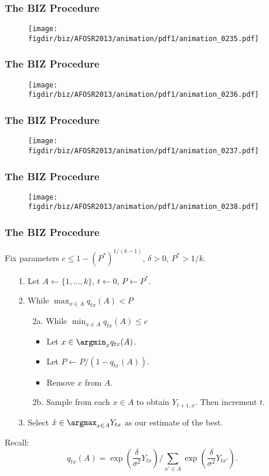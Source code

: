 \documentclass[13pt]{beamer}
\newcommand{\figdir}{../../fig}
\newcommand{\xhat}{\hat{x}}
\newcommand{\upthresh}{P}
\begin{document}
{\begin{frame}\frametitle{The BIZ Procedure}\begin{figure}\texttt{[image: \\figdir/biz/AFOSR2013/animation/pdf1/animation\_0235.pdf]}\end{figure}\end{frame}
\begin{frame}\frametitle{The BIZ Procedure}\begin{figure}\texttt{[image: \\figdir/biz/AFOSR2013/animation/pdf1/animation\_0236.pdf]}\end{figure}\end{frame}
\begin{frame}\frametitle{The BIZ Procedure}\begin{figure}\texttt{[image: \\figdir/biz/AFOSR2013/animation/pdf1/animation\_0237.pdf]}\end{figure}\end{frame}
\begin{frame}\frametitle{The BIZ Procedure}\begin{figure}\texttt{[image: \\figdir/biz/AFOSR2013/animation/pdf1/animation\_0238.pdf]}\end{figure}\end{frame}
}





\begin{frame}
  \frametitle{The BIZ Procedure}
  Fix parameters $c \le 1-(P^*)^{1/(k-1)}$, $\delta>0$, $P^*>1/k$.
  \begin{itemize}
    \item[1.] Let $A \leftarrow \{ 1,\ldots, k\}$, $t\leftarrow 0$, $\upthresh \leftarrow P^*$.
    \item[2.] While $\max_{x\in A} q_{tx}(A) < \upthresh$
    \begin{itemize}
      \item[2a.] While $\min_{x\in A} q_{tx}(A) \le c$
      \begin{itemize}
	\item Let $x \in \argmin_x q_{tx}(A)$.
	\item Let $\upthresh \leftarrow \upthresh/(1-q_{tx}(A))$.
	\item Remove $x$ from $A$.
      \end{itemize}
    \item[2b.] Sample from each $x\in A$ to obtain $Y_{t+1,x}$.  Then increment $t$.
    \end{itemize}
  \item[3.] Select $\xhat \in \argmax_{x\in A} Y_{tx}$ as our estimate of the best.
  \end{itemize}
  \bigskip
  Recall:
\begin{equation*}
  q_{tx}(A) = \exp\left(\frac{\delta}{\sigma^2} Y_{tx}\right) \bigg/ \sum_{x'\in A} \exp\left(\frac{\delta}{\sigma^2} Y_{tx'}\right).
\end{equation*}
\end{frame} 
\end{document}
